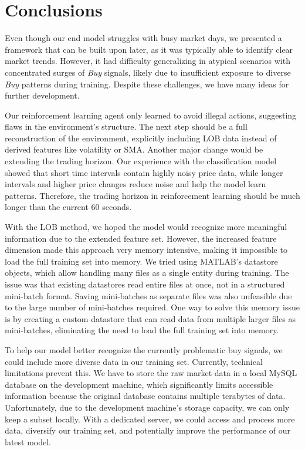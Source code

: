 \documentclass[a4paper,oneside,onecolumn,12pt]{book}
\begin{document}
\section{Conclusions}
	Even though our end model struggles with busy market days, we presented a framework that can be built upon later, as it was typically able to identify clear market trends. However, it had difficulty generalizing in atypical scenarios with concentrated surges of \textit{Buy} signals, likely due to insufficient exposure to diverse \textit{Buy} patterns during training. Despite these challenges, we have many ideas for further development.

	Our reinforcement learning agent only learned to avoid illegal actions, suggesting flaws in the environment's structure. The next step should be a full reconstruction of the environment, explicitly including LOB data instead of derived features like volatility or SMA. Another major change would be extending the trading horizon. Our experience with the classification model showed that short time intervals contain highly noisy price data, while longer intervals and higher price changes reduce noise and help the model learn patterns. Therefore, the trading horizon in reinforcement learning should be much longer than the current 60 seconds.

	With the LOB method, we hoped the model would recognize more meaningful information due to the extended feature set. However, the increased feature dimension made this approach very memory intensive, making it impossible to load the full training set into memory. We tried using MATLAB's datastore objects, which allow handling many files as a single entity during training. The issue was that existing datastores read entire files at once, not in a structured mini-batch format. Saving mini-batches as separate files was also unfeasible due to the large number of mini-batches required. One way to solve this memory issue is by creating a custom datastore that can read data from multiple larger files as mini-batches, eliminating the need to load the full training set into memory.

	To help our model better recognize the currently problematic buy signals, we could include more diverse data in our training set. Currently, technical limitations prevent this. We have to store the raw market data in a local MySQL database on the development machine, which significantly limits accessible information because the original database contains multiple terabytes of data. Unfortunately, due to the development machine's storage capacity, we can only keep a subset locally. With a dedicated server, we could access and process more data, diversify our training set, and potentially improve the performance of our latest model.
\end{document}
